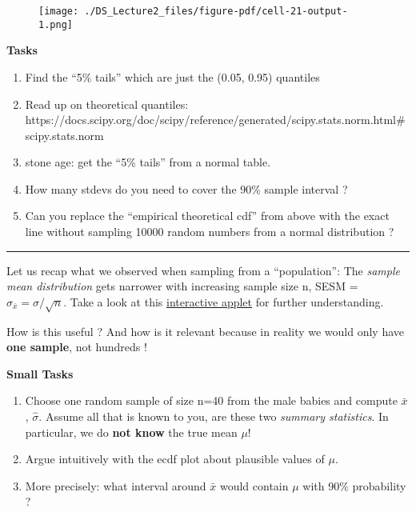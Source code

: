 \documentclass[
  letterpaper,
  DIV=11,
  numbers=noendperiod]{scrreprt}
\providecommand{\tightlist}{%
  \setlength{\itemsep}{0pt}\setlength{\parskip}{0pt}}\usepackage{longtable,booktabs,array}
\begin{document}
\begin{figure}[H]

{\centering \texttt{[image: ./DS\_Lecture2\_files/figure-pdf/cell-21-output-1.png]}

}

\end{figure}

\textbf{Tasks}

\begin{enumerate}
\def\labelenumi{\arabic{enumi}.}
\tightlist
\item
  Find the ``5\% tails'' which are just the (0.05, 0.95) quantiles
\item
  Read up on theoretical quantiles:
  https://docs.scipy.org/doc/scipy/reference/generated/scipy.stats.norm.html\#scipy.stats.norm
\item
  stone age: get the ``5\% tails'' from a normal table.
\item
  How many stdevs do you need to cover the 90\% sample interval ?
\item
  Can you replace the ``empirical theoretical cdf'' from above with the
  exact line without sampling 10000 random numbers from a normal
  distribution ?
\end{enumerate}

\begin{center}\rule{0.5\linewidth}{0.5pt}\end{center}

Let us recap what we observed when sampling from a ``population'': The
\emph{sample mean distribution} gets narrower with increasing sample
size n, SESM =\(\sigma_{\bar{x}} = \sigma/\sqrt{n}\). Take a look at
this
\href{http://onlinestatbook.com/stat_sim/sampling_dist/}{interactive
applet} for further understanding.

How is this useful ? And how is it relevant because in reality we would
only have \textbf{one sample}, not hundreds !

\textbf{Small Tasks}

\begin{enumerate}
\def\labelenumi{\arabic{enumi}.}
\tightlist
\item
  Choose one random sample of size n=40 from the male babies and compute
  \(\bar{x}\), \(\hat{\sigma}\). Assume all that is known to you, are
  these two \emph{summary statistics}. In particular, we do \textbf{not
  know} the true mean \(\mu\)!
\item
  Argue intuitively with the ecdf plot about plausible values of
  \(\mu\).
\item
  More precisely: what interval around \(\bar{x}\) would contain \(\mu\)
  with 90\% probability ?
\end{enumerate}
\end{document}
